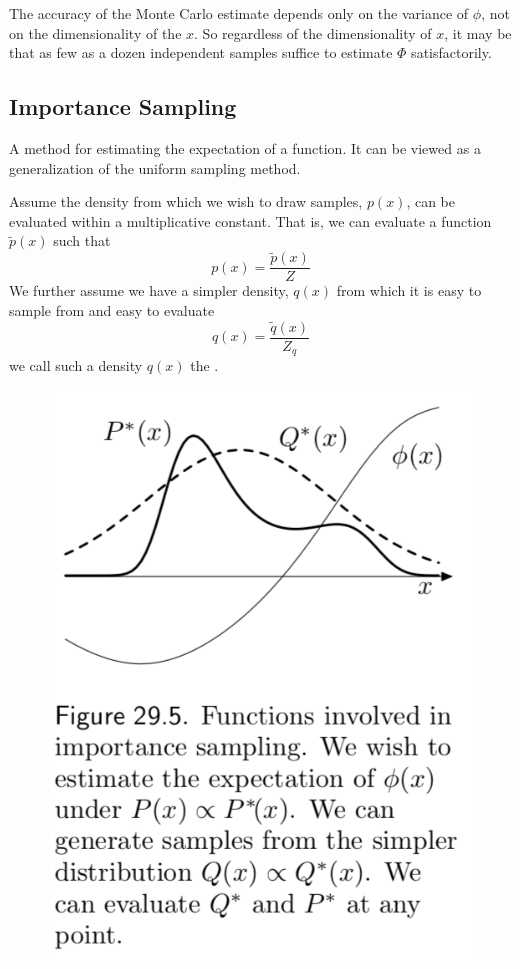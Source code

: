\documentclass[11pt]{article}
\begin{document}
\remark
The accuracy of the Monte Carlo estimate depends only on the variance of $\phi$, not on the dimensionality of the $x$. So regardless of the dimensionality of $x$, it may be that as few as a dozen independent samples suffice to estimate $\Phi$ satisfactorily.

\subsection{Importance Sampling}
A method for estimating the expectation of a function. It can be viewed as a generalization of the uniform sampling method.

Assume the density from which we wish to draw samples, $p(x)$, can be evaluated within a multiplicative constant. That is, we can evaluate a function $\tilde{p}(x)$ such that 
$$p(x) = \frac{\tilde{p}(x)}{Z}$$
We further assume we have a simpler density, $q(x)$ from which it is easy to sample from and easy to evaluate
$$q(x) = \frac{\tilde{q}(x)}{Z_q}$$
we call such a density $q(x)$ the . \\
\begin{figure}[H]
	\centering
	\includegraphics[scale=0.23]{p9.png}
\end{figure}
\end{document}
